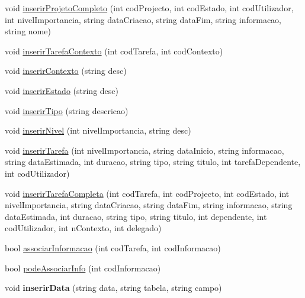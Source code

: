 \begin{DoxyCompactItemize}
\item 
void \hyperlink{class_b_dados_ad4d9cf1b7a66137635fe0b4b206437fe}{inserir\-Projeto\-Completo} (int cod\-Projecto, int cod\-Estado, int cod\-Utilizador, int nivel\-Importancia, string data\-Criacao, string data\-Fim, string informacao, string nome)
\item 
void \hyperlink{class_b_dados_a0773f95213edc45aff09f12e0aac5d51}{inserir\-Tarefa\-Contexto} (int cod\-Tarefa, int cod\-Contexto)
\item 
void \hyperlink{class_b_dados_a6cf31d662e823a3af666feac9d0b547e}{inserir\-Contexto} (string desc)
\item 
void \hyperlink{class_b_dados_a4773e15427a3d89c36e8dfbccb68b962}{inserir\-Estado} (string desc)
\item 
void \hyperlink{class_b_dados_a24dafc04c43e61c8ad601cf3e8965f1c}{inserir\-Tipo} (string descricao)
\item 
void \hyperlink{class_b_dados_ad720996192c985f34a933f12fb8024f9}{inserir\-Nivel} (int nivel\-Importancia, string desc)
\item 
void \hyperlink{class_b_dados_a10638c7beb779c93a3ad588c36d9ba36}{inserir\-Tarefa} (int nivel\-Importancia, string data\-Inicio, string informacao, string data\-Estimada, int duracao, string tipo, string titulo, int tarefa\-Dependente, int cod\-Utilizador)
\item 
void \hyperlink{class_b_dados_aeedec6e5cfc470b2dfcf93b2cf5d06e0}{inserir\-Tarefa\-Completa} (int cod\-Tarefa, int cod\-Projecto, int cod\-Estado, int nivel\-Importancia, string data\-Criacao, string data\-Fim, string informacao, string data\-Estimada, int duracao, string tipo, string titulo, int dependente, int cod\-Utilizador, int n\-Contexto, int delegado)
\item 
bool \hyperlink{class_b_dados_a9300d771200d124da4c862e430e87988}{associar\-Informacao} (int cod\-Tarefa, int cod\-Informacao)
\item 
bool \hyperlink{class_b_dados_aa803085cb66d76477151ec0c01079943}{pode\-Associar\-Info} (int cod\-Informacao)
\item 
\hypertarget{class_b_dados_a25a839976a0d80a289d4a9248ff37fd0}{void {\bfseries inserir\-Data} (string data, string tabela, string campo)}\label{class_b_dados_a25a839976a0d80a289d4a9248ff37fd0}


\end{DoxyCompactItemize}
